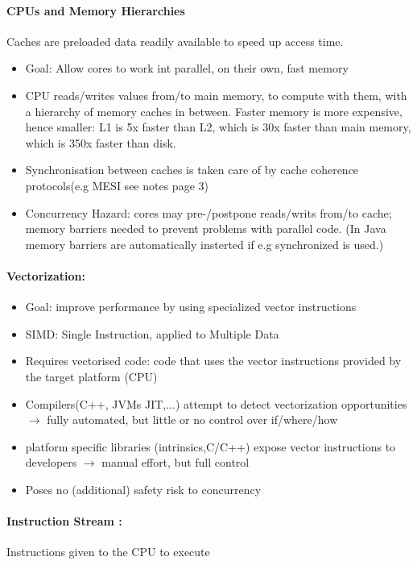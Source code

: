 \documentclass[8pt]{extreport}
\begin{document}
\paragraph{CPUs and Memory Hierarchies}Caches are preloaded data readily available to speed up access time. 
\begin{itemize}
\item Goal: Allow cores to work int parallel, on their own, fast memory
\item CPU reads/writes values from/to main memory, to compute with them, with a hierarchy of memory caches in between. Faster memory is more expensive, hence smaller: L1 is 5x faster than L2, which is 30x faster than main memory, which is 350x faster than disk.
\item Synchronisation between caches is taken care of by cache coherence protocols(e.g MESI see notes page 3)
\item Concurrency Hazard: cores may pre-/postpone reads/writs from/to cache; memory barriers needed to prevent problems with parallel code. (In Java memory barriers are automatically insterted if e.g synchronized is used.)
\end{itemize}

\paragraph{Vectorization: } 
\begin{itemize}
\item Goal: improve performance by using specialized vector instructions
\item SIMD: Single Instruction, applied to Multiple Data
\item Requires vectorised code: code that uses the vector instructions provided by the target platform (CPU)
\item Compilers(C++, JVMs JIT,...) attempt to detect vectorization opportunities $\rightarrow$ fully automated, but little or no control over if/where/how
\item platform specific libraries (intrinsics,C/C++) expose vector instructions to developers $\rightarrow$ manual effort, but full control
\item Poses no (additional) safety risk to concurrency
\end{itemize}
\paragraph{Instruction Stream :} Instructions given to the CPU to execute
\end{document}
